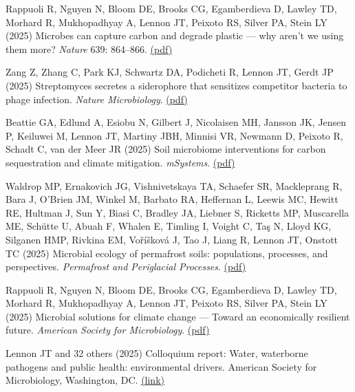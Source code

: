 \documentclass[11pt]{article}
\begin{document}
\begin{etaremune}
\item Rappuoli R, Nguyen N, Bloom DE, Brooks CG, Egamberdieva D, Lawley TD, Morhard R, Mukhopadhyay A, Lennon JT, Peixoto RS, Silver PA, Stein LY (2025) Microbes can capture carbon and degrade plastic — why aren’t we using them more? \textit{Nature} 639: 864–866. \href{https://lennonlab.github.io/assets/publications/Rappuoli_etal_2025a.pdf}{(pdf)}

\item Zang Z, Zhang C, Park KJ, Schwartz DA, Podicheti R, Lennon JT, Gerdt JP (2025) Streptomyces secretes a siderophore that sensitizes competitor bacteria to phage infection. \textit{Nature Microbiology}. \href{https://lennonlab.github.io/assets/publications/Zang_etal_2025.pdf}{(pdf)}

\item Beattie GA, Edlund A, Esiobu N, Gilbert J, Nicolaisen MH, Jansson JK, Jensen P, Keiluwei M, Lennon JT, Martiny JBH, Minnisi VR, Newmann D, Peixoto R, Schadt C, van der Meer JR (2025) Soil microbiome interventions for carbon sequestration and climate mitigation. \textit{mSystems}. \href{https://lennonlab.github.io/assets/publications/Beattie_etal_2025.pdf}{(pdf)}

\item Waldrop MP, Ernakovich JG, Vishnivetskaya TA, Schaefer SR, Mackleprang R, Bara J, O'Brien JM, Winkel M, Barbato RA, Heffernan L, Leewis MC, Hewitt RE, Hultman J, Sun Y, Biasi C, Bradley JA, Liebner S, Ricketts MP, Muscarella ME, Schütte U, Abuah F, Whalen E, Timling I, Voight C, Taş N, Lloyd KG, Silganen HMP, Rivkina EM, Voříšková J, Tao J, Liang R, Lennon JT, Onstott TC (2025) Microbial ecology of permafrost soils: populations, processes, and perspectives. \textit{Permafrost and Periglacial Processes}. \href{https://lennonlab.github.io/assets/publications/Waldrop_etal_2025.pdf}{(pdf)}

\item Rappuoli R, Nguyen N, Bloom DE, Brooks CG, Egamberdieva D, Lawley TD, Morhard R, Mukhopadhyay A, Lennon JT, Peixoto RS, Silver PA, Stein LY (2025) Microbial solutions for climate change — Toward an economically resilient future. \textit{American Society for Microbiology}. \href{https://lennonlab.github.io/assets/publications/Rappuoli_etal_2025b.pdf}{(pdf)}

\item Lennon JT and 32 others (2025) Colloquium report: Water, waterborne
pathogens and public health: environmental drivers. American Society for Microbiology, Washington, DC. \href{https://asm.org/reports/water-waterborne-pathogens-and-public-health-envi}{(link)}


\end{etaremune}
\end{document}
